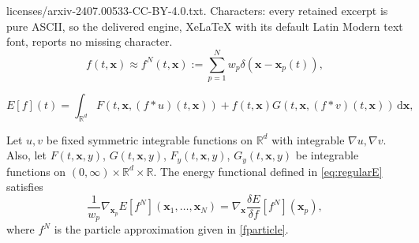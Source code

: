 \documentclass[10pt,a4paper]{amsart}
\newcommand{\bbx}{\bm x}
\newcommand{\rd}{\,\mathrm{d}}
\begin{document}
licenses/arxiv-2407.00533-CC-BY-4.0.txt. Characters: every retained excerpt is pure ASCII, so the delivered engine, XeLaTeX with its default Latin Modern text font, reports no missing character.
\begin{equation} \label{fparticle}
f(t,\bbx) \approx f^N(t,\bbx) := \sum_{p=1}^N w_p \delta (\bbx -\bbx_p(t)),
\end{equation}

\begin{equation} \label{eq:regularE}
E[f](t) = \int_{\mathbb{R}^d} F(t,\bm x, (f*u)(t,\bm x)) + f(t,\bm x)G(t,\bm x,(f*v)(t,\bm x)) \rd \bm x,
\end{equation}

\begin{lemma}
    Let $u,v$ be fixed symmetric integrable functions on $\mathbb{R}^d$ with integrable $\nabla u, \nabla v$. Also, let $F(t,\bm x, y)$, $G(t,\bm x, y)$, $F_y(t,\bm x, y)$, $G_y(t,\bm x, y)$ be integrable functions on $(0,\infty)\times\mathbb{R}^d\times \mathbb{R}$. The energy functional defined in \eqref{eq:regularE} satisfies 
    \begin{equation}
        \frac{1}{w_p}\nabla_{\bm x_p} E[f^N](\bm x_1,\dots,\bm x_N) = \nabla_{\bm x}\frac{\delta E}{\delta f}[f^N](\bm x_p),
    \end{equation} \label{lem:compCond}
 where $f^N$ is the particle approximation given in \eqref{fparticle}.
\end{lemma}
\end{document}
